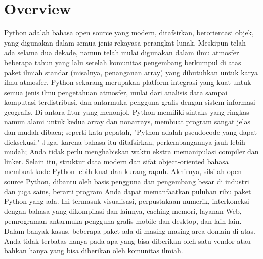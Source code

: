 
\section{Overview}

Python adalah bahasa open source yang modern, ditafsirkan, berorientasi objek, yang digunakan dalam semua jenis rekayasa perangkat lunak. Meskipun telah ada selama dua dekade, namun telah mulai digunakan dalam ilmu atmosfer beberapa tahun yang lalu setelah komunitas pengembang berkumpul di atas paket ilmiah standar (misalnya, penanganan array) yang dibutuhkan untuk karya ilmu atmosfer. 
Python sekarang merupakan platform integrasi yang kuat untuk semua jenis ilmu pengetahuan atmosfer, mulai dari analisis data sampai komputasi terdistribusi, dan antarmuka pengguna grafis dengan sistem informasi geografis. Di antara fitur yang menonjol, 
Python memiliki sintaks yang ringkas namun alami untuk kedua array dan nonarrays, membuat program sangat jelas dan mudah dibaca; seperti kata pepatah, "Python adalah pseudocode yang dapat dieksekusi."
Juga, karena bahasa itu ditafsirkan, perkembangannya jauh lebih mudah; Anda tidak perlu menghabiskan waktu ekstra memanipulasi compiler dan linker. Selain itu, struktur data modern dan sifat object-oriented bahasa membuat kode Python lebih kuat dan kurang rapuh. Akhirnya, silsilah open source Python, dibantu oleh basis pengguna dan pengembang besar di industri dan juga sains, 
berarti program Anda dapat memanfaatkan puluhan ribu paket Python yang ada. Ini termasuk visualisasi, perpustakaan numerik, interkoneksi dengan bahasa yang dikompilasi dan lainnya, caching memori, layanan Web, pemrograman antarmuka pengguna grafis mobile dan desktop, 
dan lain-lain. Dalam banyak kasus, beberapa paket ada di masing-masing area domain di atas. Anda tidak terbatas hanya pada apa yang bisa diberikan oleh satu vendor atau bahkan hanya yang bisa diberikan oleh komunitas ilmiah.

